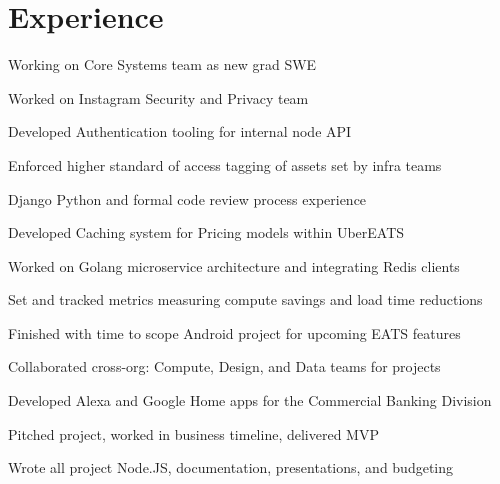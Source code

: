 \documentclass[]{deedy-resume-openfont}
\begin{document}
\begin{minipage}[t]{0.66\textwidth}


\section{Experience}

\vspace{\topsep} %
\begin{tightemize}
\item Working on Core Systems team as new grad SWE
\end{tightemize}
\sectionsep

\begin{tightemize}
\item Worked on Instagram Security and Privacy team
\item Developed Authentication tooling for internal node API
\item Enforced higher standard of access tagging of assets set by infra teams
\item Django Python and formal code review process experience
\end{tightemize}
\sectionsep

\begin{tightemize}
\item Developed Caching system for Pricing models within UberEATS
\item Worked on Golang microservice architecture and integrating Redis clients
\item Set and tracked metrics measuring compute savings and load time reductions
\item Finished with time to scope Android project for upcoming EATS features
\item Collaborated cross-org: Compute, Design, and Data teams for projects
\end{tightemize}
\sectionsep

\begin{tightemize}
\item Developed Alexa and Google Home apps for the Commercial Banking Division
\item Pitched project, worked in business timeline, delivered MVP
\item Wrote all project Node.JS, documentation, presentations, and budgeting
\end{tightemize}
\sectionsep


\end{minipage}
\end{document}
